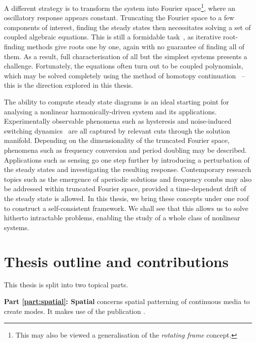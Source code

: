 A different strategy is to transform the system into Fourier space\footnote{This may also be viewed a generalisation of the \textit{rotating frame} concept.}, where an oscillatory response appears constant. Truncating the Fourier space to a few components of interest, finding the steady states then necessitates solving a set of coupled algebraic equations. This is still a formidable task~\cite{Bernshtein1975,sturmfels2002solving,cox2005solving}, as iterative root-finding methods give roots one by one, again with no guarantee of finding all of them. As a result, full characterisation of all but the simplest systems presents a challenge.  Fortunately, the equations often turn out to be coupled polynomials, which may be solved completely using the method of homotopy continuation~\cite{Sommese2005,Breiding_2018,timme2021numerical} -- this is the direction explored in this thesis. 

The ability to compute steady state diagrams is an ideal starting point for analysing a nonlinear harmonically-driven system and its applications. Experimentally observable phenomena such as hysteresis and noise-induced switching dynamics~\cite{Leuch_2016, Heugel_2019, Margiani2021} are all captured by relevant cuts through the solution manifold. Depending on the dimensionality of the truncated Fourier space, phenomena such as frequency conversion and period doubling may be described. Applications such as sensing go one step further by introducing a perturbation of the steady states and investigating the resulting response. Contemporary research topics such as the emergence of aperiodic solutions and frequency combs may also be addressed within truncated Fourier space, provided a time-dependent drift of the steady state is allowed. In this thesis, we bring these concepts under one roof to construct a self-consistent framework. We shall see that this allows us to solve hitherto intractable problems, enabling the study of a whole class of nonlinear systems.


\section{Thesis outline and contributions}

This thesis is split into two topical parts. 

\textbf{Part \ref{part:spatial}: Spatial} concerns spatial patterning of continuous media to create modes. It makes use of the publication \cite{Kosata_2021}.

